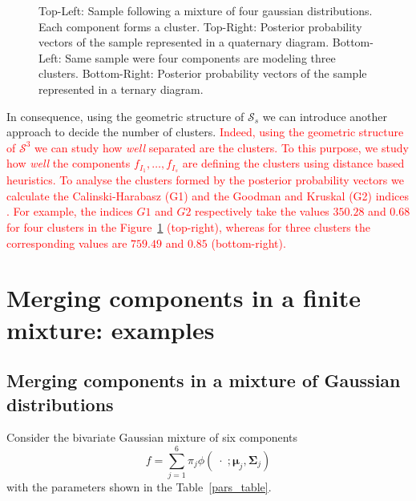 \documentclass[submit]{smj}
\theoremstyle{definition}
\newcommand{\m}[1]{\boldsymbol{#1}}
\begin{document}
\begin{figure}[thbp]
\begin{center}
\begin{tabular}{cc}
 \end{tabular}
 \caption{Top-Left: Sample following a mixture of four gaussian distributions. Each component forms a cluster. Top-Right: Posterior probability vectors of the sample represented in a quaternary diagram. Bottom-Left: Same sample were four components are modeling three clusters. Bottom-Right: Posterior probability vectors of the sample represented in a ternary diagram.}\label{cluster_post}
\end{center}
\end{figure}

In consequence, using the geometric structure of $\mathcal{S}_s$  we can introduce another approach to decide the number of clusters. \textcolor{red}{Indeed, using the geometric structure of $\mathcal{S}^3$ we can study how \emph{well} separated are the clusters. To this purpose, we study how \emph{well} the components $f_{I_1}, \dots, f_{I_s}$ are defining the clusters using distance based heuristics. To analyse the clusters formed by the posterior probability vectors we calculate the Calinski-Harabasz (G1) and the Goodman and Kruskal (G2) indices \citep{milligan1985}. For example, the indices $G1$ and $G2$ respectively take the values $350.28$ and $0.68$ for four clusters in the Figure~\ref{cluster_post} (top-right), whereas for three clusters the corresponding values are $759.49$ and $0.85$ (bottom-right).}





\section{Merging components in a finite mixture: examples}\label{merging_examples_dist}

\subsection{Merging components in a mixture of Gaussian distributions}

Consider the bivariate Gaussian mixture of six components \citep{baudry2010combining}
\[
f= \sum_{j=1}^6 \pi_j \phi(\;\cdot\; ;  \m\mu_j, \m\Sigma_j)
\]
with the parameters shown in the Table~\ref{pars_table}. 
\end{document}
